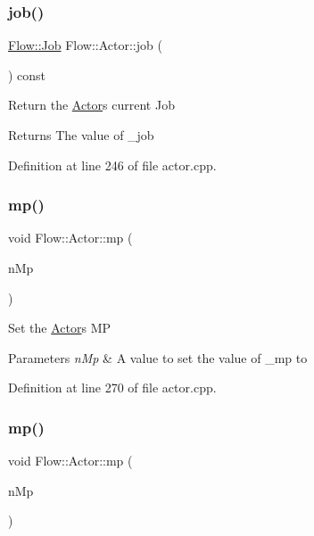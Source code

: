 \subsubsection{\texorpdfstring{job()}{job()}\hspace{0.1cm}{\footnotesize\ttfamily [2/2]}}
{\footnotesize\ttfamily \hyperlink{namespace_flow_a05bb774db920847e46f3779aaef1b07b}{Flow\+::\+Job} Flow\+::\+Actor\+::job (\begin{DoxyParamCaption}{ }\end{DoxyParamCaption}) const}

Return the \hyperlink{class_flow_1_1_actor}{Actor}\textquotesingle{}s current Job \begin{DoxyReturn}{Returns}
The value of \+\_\+job 
\end{DoxyReturn}


Definition at line 246 of file actor.\+cpp.

\hypertarget{class_flow_1_1_actor_aca6243d244b329bed207352fdc3646be}{}\label{class_flow_1_1_actor_aca6243d244b329bed207352fdc3646be} 
\subsubsection{\texorpdfstring{mp()}{mp()}\hspace{0.1cm}{\footnotesize\ttfamily [1/3]}}
{\footnotesize\ttfamily void Flow\+::\+Actor\+::mp (\begin{DoxyParamCaption}\item[{int}]{n\+Mp }\end{DoxyParamCaption})}

Set the \hyperlink{class_flow_1_1_actor}{Actor}\textquotesingle{}s MP 
\begin{DoxyParams}{Parameters}
{\em n\+Mp} & A value to set the value of \+\_\+mp to \\
\hline
\end{DoxyParams}


Definition at line 270 of file actor.\+cpp.

\hypertarget{class_flow_1_1_actor_a655ad26be9ed06a24653c3413390ac10}{}\label{class_flow_1_1_actor_a655ad26be9ed06a24653c3413390ac10} 
\subsubsection{\texorpdfstring{mp()}{mp()}\hspace{0.1cm}{\footnotesize\ttfamily [2/3]}}
{\footnotesize\ttfamily void Flow\+::\+Actor\+::mp (\begin{DoxyParamCaption}\item[{const \hyperlink{class_flow_1_1_i_stat}{I\+Stat} \&}]{n\+Mp }\end{DoxyParamCaption})}

